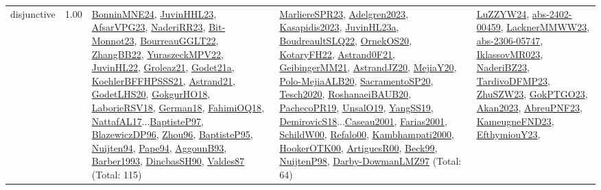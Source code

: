 {\begin{longtable}{p{3cm}r>{\raggedright\arraybackslash}p{6cm}>{\raggedright\arraybackslash}p{6cm}>{\raggedright\arraybackslash}p{8cm}}
\index{disjunctive}\index{Constraints!disjunctive}disjunctive &  1.00 & \hyperref[detail:BonninMNE24]{BonninMNE24}, \hyperref[detail:JuvinHHL23]{JuvinHHL23}, \hyperref[detail:AfsarVPG23]{AfsarVPG23}, \hyperref[detail:NaderiRR23]{NaderiRR23}, \hyperref[detail:Bit-Monnot23]{Bit-Monnot23}, \hyperref[detail:BourreauGGLT22]{BourreauGGLT22}, \hyperref[detail:ZhangBB22]{ZhangBB22}, \hyperref[detail:YuraszeckMPV22]{YuraszeckMPV22}, \hyperref[detail:JuvinHL22]{JuvinHL22}, \hyperref[detail:Groleaz21]{Groleaz21}, \hyperref[detail:Godet21a]{Godet21a}, \hyperref[detail:KoehlerBFFHPSSS21]{KoehlerBFFHPSSS21}, \hyperref[detail:Astrand21]{Astrand21}, \hyperref[detail:GodetLHS20]{GodetLHS20}, \hyperref[detail:GokgurHO18]{GokgurHO18}, \hyperref[detail:LaborieRSV18]{LaborieRSV18}, \hyperref[detail:German18]{German18}, \hyperref[detail:FahimiOQ18]{FahimiOQ18}, \hyperref[detail:NattafAL17]{NattafAL17}...\hyperref[detail:BaptisteP97]{BaptisteP97}, \hyperref[detail:BlazewiczDP96]{BlazewiczDP96}, \hyperref[detail:Zhou96]{Zhou96}, \hyperref[detail:BaptisteP95]{BaptisteP95}, \hyperref[detail:Nuijten94]{Nuijten94}, \hyperref[detail:Pape94]{Pape94}, \hyperref[detail:AggounB93]{AggounB93}, \hyperref[detail:Barber1993]{Barber1993}, \hyperref[detail:DincbasSH90]{DincbasSH90}, \hyperref[detail:Valdes87]{Valdes87} (Total: 115) & \hyperref[detail:MarliereSPR23]{MarliereSPR23}, \hyperref[detail:Adelgren2023]{Adelgren2023}, \hyperref[detail:Kasapidis2023]{Kasapidis2023}, \hyperref[detail:JuvinHL23a]{JuvinHL23a}, \hyperref[detail:BoudreaultSLQ22]{BoudreaultSLQ22}, \hyperref[detail:OrnekOS20]{OrnekOS20}, \hyperref[detail:KotaryFH22]{KotaryFH22}, \hyperref[detail:Astrand0F21]{Astrand0F21}, \hyperref[detail:GeibingerMM21]{GeibingerMM21}, \hyperref[detail:AstrandJZ20]{AstrandJZ20}, \hyperref[detail:MejiaY20]{MejiaY20}, \hyperref[detail:Polo-MejiaALB20]{Polo-MejiaALB20}, \hyperref[detail:SacramentoSP20]{SacramentoSP20}, \hyperref[detail:Tesch2020]{Tesch2020}, \hyperref[detail:RoshanaeiBAUB20]{RoshanaeiBAUB20}, \hyperref[detail:PachecoPR19]{PachecoPR19}, \hyperref[detail:UnsalO19]{UnsalO19}, \hyperref[detail:YangSS19]{YangSS19}, \hyperref[detail:DemirovicS18]{DemirovicS18}...\hyperref[detail:Caseau2001]{Caseau2001}, \hyperref[detail:Farias2001]{Farias2001}, \hyperref[detail:SchildW00]{SchildW00}, \hyperref[detail:Refalo00]{Refalo00}, \hyperref[detail:Kambhampati2000]{Kambhampati2000}, \hyperref[detail:HookerOTK00]{HookerOTK00}, \hyperref[detail:ArtiguesR00]{ArtiguesR00}, \hyperref[detail:Beck99]{Beck99}, \hyperref[detail:NuijtenP98]{NuijtenP98}, \hyperref[detail:Darby-DowmanLMZ97]{Darby-DowmanLMZ97} (Total: 64) & \hyperref[detail:LuZZYW24]{LuZZYW24}, \hyperref[detail:abs-2402-00459]{abs-2402-00459}, \hyperref[detail:LacknerMMWW23]{LacknerMMWW23}, \hyperref[detail:abs-2306-05747]{abs-2306-05747}, \hyperref[detail:IklassovMR023]{IklassovMR023}, \hyperref[detail:NaderiBZ23]{NaderiBZ23}, \hyperref[detail:TardivoDFMP23]{TardivoDFMP23}, \hyperref[detail:ZhuSZW23]{ZhuSZW23}, \hyperref[detail:GokPTGO23]{GokPTGO23}, \hyperref[detail:Akan2023]{Akan2023}, \hyperref[detail:AbreuPNF23]{AbreuPNF23}, \hyperref[detail:KameugneFND23]{KameugneFND23}, \hyperref[detail:EfthymiouY23]{EfthymiouY23}, 
\end{longtable}}
